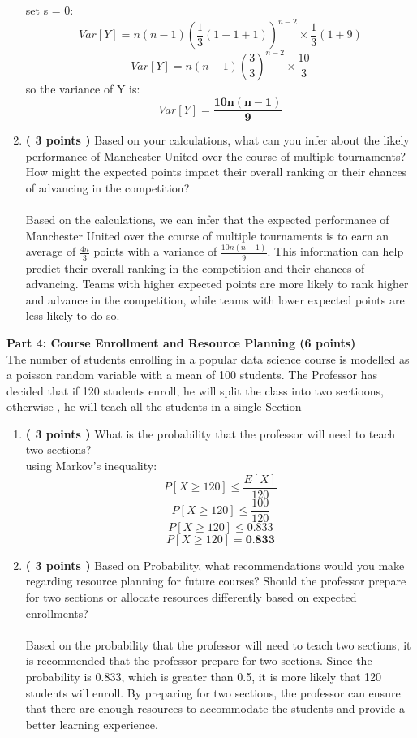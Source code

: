 \documentclass[a3paper,12pt]{extarticle} %
\begin{document}
\begin{enumerate}
\[        \]
        set s = 0:
        \[
        Var[Y] = n(n-1)\left(\frac{1}{3}(1 + 1 + 1)\right)^{n-2} \times \frac{1}{3}(1 + 9)
        \]
        \[
        Var[Y] = n(n-1)\left(\frac{3}{3}\right)^{n-2} \times \frac{10}{3}
        \]
        so the variance of Y is:
        \[
        Var[Y] = \mathbf{\frac{10n(n-1)}{9}}
        \]
        \item \textbf{( 3 points )} Based on your calculations, what can you infer about the likely performance of Manchester United over the course of multiple tournaments? How might the expected points impact their overall ranking or their chances of advancing in the competition?
        \\\\ Based on the calculations, we can infer that the expected performance of Manchester United over the course of multiple tournaments is to earn an average of \(\frac{4n}{3}\) points with a variance of \(\frac{10n(n-1)}{9}\). This information can help predict their overall ranking in the competition and their chances of advancing. Teams with higher expected points are more likely to rank higher and advance in the competition, while teams with lower expected points are less likely to do so.
    \end{enumerate}
    \subitem \textbf{Part 4: Course Enrollment and Resource Planning (6 points)}
    \\ The number of students enrolling in a popular data science course is modelled as a poisson random variable with a mean of 100 students. The Professor has decided that if 120 students enroll, he will split the class into two sectioons, otherwise , he will teach all the students in a single Section
    \begin{enumerate}
        \item \textbf{( 3 points )} What is the probability that the professor will need to teach two sections?
        \\ using Markov's inequality:
        \[
        P[X \geq 120] \leq \frac{E[X]}{120}
        \]
        \[
        P[X \geq 120] \leq \frac{100}{120}
        \]
        \[
        P[X \geq 120] \leq 0.833
        \]
        \[
        P[X \geq 120] = \textbf{0.833}
        \]
        \item \textbf{( 3 points )} Based on Probability, what recommendations would you make regarding resource planning for future courses? Should the professor prepare for two sections or allocate resources differently based on expected enrollments?
        \\\\ Based on the probability that the professor will need to teach two sections, it is recommended that the professor prepare for two sections. Since the probability is 0.833, which is greater than 0.5, it is more likely that 120 students will enroll. By preparing for two sections, the professor can ensure that there are enough resources to accommodate the students and provide a better learning experience.
    \end{enumerate}
\end{document}
